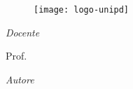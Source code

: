 \frontmatter

\begin{titlepage}

\begin{center}

\begin{LARGE}
\textbf{\myUni}											%
\end{LARGE}

\vspace{10pt}											%

\begin{Large}
\textsc{\myDepartment}								%
\end{Large}

\vspace{10pt}											%

\begin{large}
\textsc{\myFaculty}										%
\end{large}

\vspace{30pt}											%

\begin{figure}[htbp]									%
\begin{center}											%
\texttt{[image: logo-unipd]}			%
\end{center}

\end{figure}

\vspace{30pt}											%

\begin{center}											%
\begin{LARGE}
\textbf{\myTitle}
\end{LARGE}
\end{center}

\begin{large}
\begin{flushleft}											%
\textit{Docente}

\vspace{5pt}
Prof. \myProf
\end{flushleft}

\begin{flushright}										%
\textit{Autore}


\end{flushright}
\end{large}
\end{center}
\end{titlepage}
